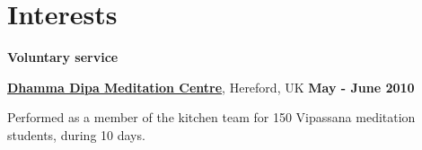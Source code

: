 %
% 
% 

% 

\section{Interests}
%
% 
% 
% 
%
\textbf{Voluntary service}

\begin{outerlist}
\item[\FA \faAngleDoubleRight] \href{http://www.dipa.dhamma.org/}{\textbf{Dhamma
Dipa Meditation Centre}}, Hereford, UK%
        \hfill \textbf{May - June 2010}
\end{outerlist}

\begin{innerlist}
\item Performed as a member of the kitchen team for 150 Vipassana meditation
students, during 10 days.
\end{innerlist}

% 

